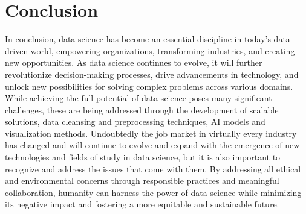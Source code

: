 \documentclass{vgtc}                          %
\begin{document}
\section{Conclusion}

In conclusion, data science has become an essential discipline in today's data-driven world, empowering organizations, transforming industries, and creating new opportunities. As data science continues 
to evolve, it will further revolutionize decision-making processes, drive advancements in technology, and unlock new possibilities for solving complex problems across various domains. While achieving 
the full potential of data science poses many significant challenges, these are being addressed through the development of scalable solutions, data cleansing and preprocessing techniques, AI models and 
visualization methods. Undoubtedly the job market in virtually every industry has changed and will continue to evolve and expand with the emergence of new technologies and fields of study in data science, 
but it is also important to recognize and address the issues that come with them. By addressing all ethical and environmental concerns through responsible practices and meaningful collaboration, humanity 
can harness the power of data science while minimizing its negative impact and fostering a more equitable and sustainable future.


%
%
%

%


\end{document}
